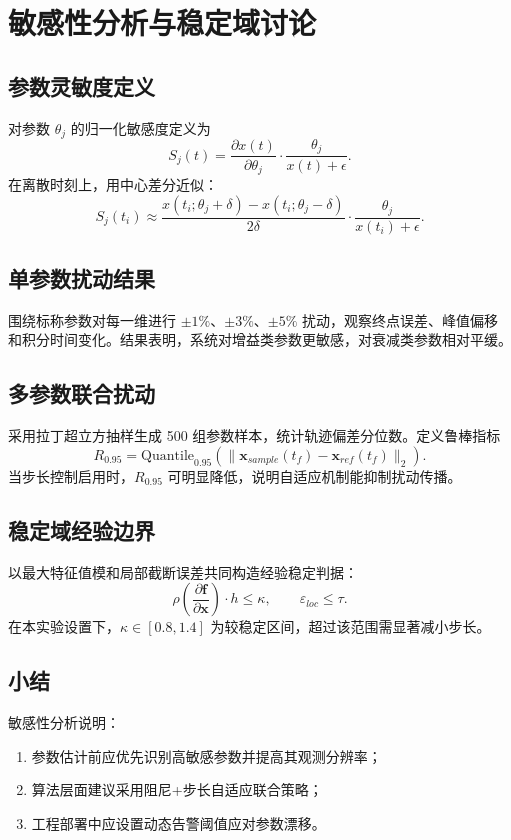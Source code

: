 \chapter{敏感性分析与稳定域讨论}

\section{参数灵敏度定义}
对参数 $\theta_j$ 的归一化敏感度定义为
\[
S_j(t)=\frac{\partial x(t)}{\partial \theta_j}\cdot \frac{\theta_j}{x(t)+\epsilon}.
\]
在离散时刻上，用中心差分近似：
\[
S_j(t_i)\approx \frac{x(t_i;\theta_j+\delta)-x(t_i;\theta_j-\delta)}{2\delta}\cdot \frac{\theta_j}{x(t_i)+\epsilon}.
\]

\section{单参数扰动结果}
围绕标称参数对每一维进行 $\pm 1\%$、$\pm 3\%$、$\pm 5\%$ 扰动，观察终点误差、峰值偏移和积分时间变化。结果表明，系统对增益类参数更敏感，对衰减类参数相对平缓。

\section{多参数联合扰动}
采用拉丁超立方抽样生成 500 组参数样本，统计轨迹偏差分位数。定义鲁棒指标
\[
R_{0.95}=\text{Quantile}_{0.95}\left(\|\mathbf{x}_{sample}(t_f)-\mathbf{x}_{ref}(t_f)\|_2\right).
\]
当步长控制启用时，$R_{0.95}$ 可明显降低，说明自适应机制能抑制扰动传播。

\section{稳定域经验边界}
以最大特征值模和局部截断误差共同构造经验稳定判据：
\[
\rho\left(\frac{\partial \mathbf{f}}{\partial \mathbf{x}}\right)\cdot h \le \kappa,\qquad \varepsilon_{loc}\le \tau.
\]
在本实验设置下，$\kappa\in [0.8,1.4]$ 为较稳定区间，超过该范围需显著减小步长。

\section{小结}
敏感性分析说明：
\begin{enumerate}
  \item 参数估计前应优先识别高敏感参数并提高其观测分辨率；
  \item 算法层面建议采用阻尼+步长自适应联合策略；
  \item 工程部署中应设置动态告警阈值应对参数漂移。
\end{enumerate}

